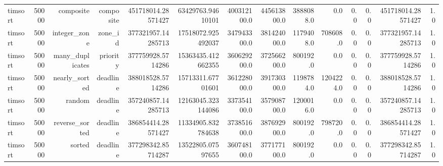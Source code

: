 \begin{table}[htbp]
\begin{tabular}{lrrrrrrrrrrrrr}
timsort & 50000 & composite & composite & 451718014.28571427 & 63429763.94610101 & 400312100.0 & 445613800.0 & 3888088.0 & 0.0 & 0.0 & 0.0 & 451718014.28571427 & 1.0 \\
timsort & 50000 & integer_zone & zone_id & 377321957.14285713 & 17518072.925492037 & 347943300.0 & 381424000.0 & 1179408.0 & 708608.0 & 0.0 & 0.0 & 377321957.14285713 & 1.0 \\
timsort & 50000 & many_duplicates & priority & 377759928.5714286 & 15363435.412662355 & 360629200.0 & 372566200.0 & 800192.0 & 0.0 & 0.0 & 0.0 & 377759928.5714286 & 1.0 \\
timsort & 50000 & nearly_sorted & deadline & 388018528.5714286 & 15713311.67701601 & 361228000.0 & 391730300.0 & 1198784.0 & 1204224.0 & 0.0 & 0.0 & 388018528.5714286 & 1.0 \\
timsort & 50000 & random & deadline & 357240857.14285713 & 12163045.323144086 & 337354100.0 & 357908700.0 & 1200016.0 & 0.0 & 0.0 & 0.0 & 357240857.14285713 & 1.0 \\
timsort & 50000 & reverse_sorted & deadline & 386854414.28571427 & 11334905.832784638 & 373851600.0 & 387692900.0 & 800192.0 & 798720.0 & 0.0 & 0.0 & 386854414.28571427 & 1.0 \\
timsort & 50000 & sorted & deadline & 377298342.85714287 & 13522805.07597655 & 360748100.0 & 377177100.0 & 800192.0 & 0.0 & 0.0 & 0.0 & 377298342.85714287 & 1.0 \\
\hline
\end{tabular}
\end{table}
